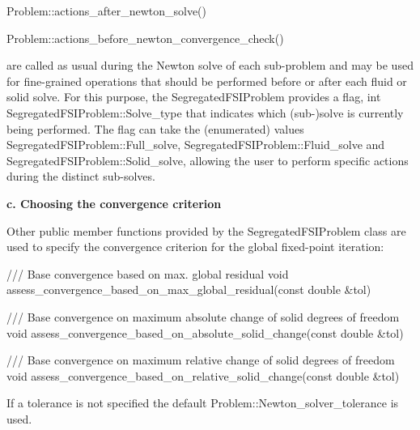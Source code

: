 \begin{DoxyCode}
Problem::actions\_after\_newton\_solve() 
\end{DoxyCode}
 
\begin{DoxyCode}
Problem::actions\_before\_newton\_convergence\_check() 
\end{DoxyCode}
 are called as usual during the Newton solve of each sub-\/problem and may be used for fine-\/grained operations that should be performed before or after each fluid or solid solve. For this purpose, the {\ttfamily Segregated\+F\+S\+I\+Problem} provides a flag, {\ttfamily int} {\ttfamily Segregated\+F\+S\+I\+Problem\+::\+Solve\+\_\+type} that indicates which (sub-\/)solve is currently being performed. The flag can take the (enumerated) values {\ttfamily Segregated\+F\+S\+I\+Problem\+::\+Full\+\_\+solve}, {\ttfamily Segregated\+F\+S\+I\+Problem\+::\+Fluid\+\_\+solve} and {\ttfamily Segregated\+F\+S\+I\+Problem\+::\+Solid\+\_\+solve}, allowing the user to perform specific actions during the distinct sub-\/solves.

{\bfseries c. Choosing the convergence criterion}

Other public member functions provided by the {\ttfamily Segregated\+F\+S\+I\+Problem} class are used to specify the convergence criterion for the global fixed-\/point iteration\+: 
\begin{DoxyCode}
\textcolor{comment}{/// Base convergence based on max. global residual}
\textcolor{comment}{}\textcolor{keywordtype}{void} assess\_convergence\_based\_on\_max\_global\_residual(\textcolor{keyword}{const} \textcolor{keywordtype}{double} &tol)
\end{DoxyCode}
 
\begin{DoxyCode}
\textcolor{comment}{/// Base convergence on maximum absolute change of solid degrees of freedom}
\textcolor{comment}{}\textcolor{keywordtype}{void} assess\_convergence\_based\_on\_absolute\_solid\_change(\textcolor{keyword}{const} \textcolor{keywordtype}{double} &tol)
\end{DoxyCode}
 
\begin{DoxyCode}
\textcolor{comment}{/// Base convergence on maximum relative change of solid degrees of freedom}
\textcolor{comment}{}\textcolor{keywordtype}{void} assess\_convergence\_based\_on\_relative\_solid\_change(\textcolor{keyword}{const} \textcolor{keywordtype}{double} &tol)
\end{DoxyCode}
 If a tolerance is not specified the default {\ttfamily Problem\+::\+Newton\+\_\+solver\+\_\+tolerance} is used.

